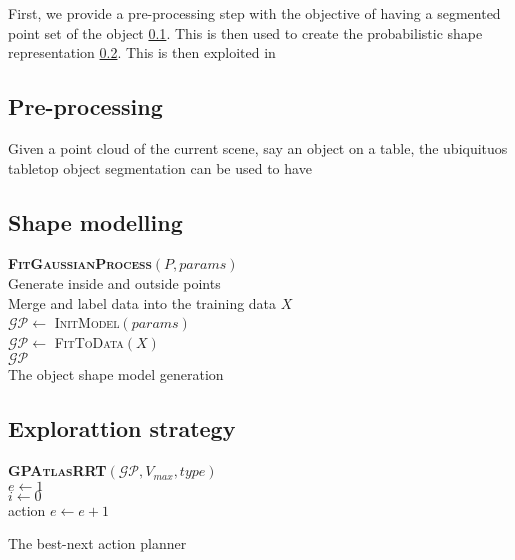 First, we provide a pre-processing step with the objective of having a segmented point set of the object \ref{sec:pre}. This is then used to create the probabilistic shape representation \ref{sec:object}. This is then exploited in 

\subsection{Pre-processing}
\label{sec:pre}

Given a point cloud of the current scene, say an object on a table, the ubiquituos tabletop object segmentation 
\citep{TabletopObjectDetector} can be used to have 

\subsection{Shape modelling}
\label{sec:object}

\begin{algorithm}[h]
\textbf{\textsc{FitGaussianProcess}}$(P, params)$\\ %
\LinesNumbered
\DontPrintSemicolon
\SetAlgoVlined {} 
  Generate inside and outside points \\
  Merge and label data into the training data $X$ \\
  $\mathcal{GP} \leftarrow$ \textsc{InitModel}$(params)$ \\
  $\mathcal{GP} \leftarrow$ \textsc{FitToData}$(X)$ \\
  \Return $\mathcal{GP}$ \\
\caption{The object shape model generation} \label{algo:strategy}
\end{algorithm}

\subsection{Explorattion strategy}
\label{sec:strategy}


\begin{algorithm}[h]
\textbf{\textsc{GPAtlasRRT}}$(\mathcal{GP}, V_{max}, type)$\\ %
\LinesNumbered
\DontPrintSemicolon
\SetAlgoVlined {} 
  $e \leftarrow 1$ \\
  {
    $i \leftarrow 0$ \\
    {
      \Return action 
    }
    $e \leftarrow e + 1$ \\
  }

\caption{The best-next action planner} \label{algo:strategy}
\end{algorithm}


